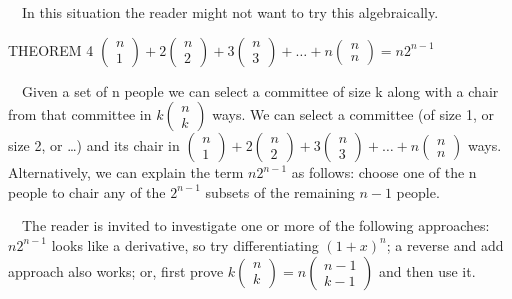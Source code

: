 \documentclass{article}
\begin{document}
\ \ In this situation the reader might not want to try this algebraically. 

THEOREM 4  
$\left(\begin{matrix}n\\1\end{matrix}\right)+2\left(\begin{matrix}n\\2\end{matrix}\right)+3\left(\begin{matrix}n\\3\end{matrix}\right)+{\dots}+n\left(\begin{matrix}n\\n\end{matrix}\right)=\mathit{n2}^{n-1}$

\ \ Given a set of  n  people we can select a committee of size  k  along with a chair from that committee in 
$k\left(\begin{matrix}n\\k\end{matrix}\right)$ ways.  We can select a committee (of size 1, or size 2, or …) and its
chair in 
$\left(\begin{matrix}n\\1\end{matrix}\right)+2\left(\begin{matrix}n\\2\end{matrix}\right)+3\left(\begin{matrix}n\\3\end{matrix}\right)+{\dots}+n\left(\begin{matrix}n\\n\end{matrix}\right)$
ways. Alternatively, we can explain the term  $n2^{n-1}$ as follows: choose one of the  n people to chair any of the 
$2^{n-1}$ subsets of the remaining  $n-1$ people. 

\ \ The reader is invited to investigate one or more of the following approaches:  $n2^{n-1}$ looks like a derivative,
so try differentiating  $\left(1+x\right)^n$; a reverse and add approach also works; or, first prove  
$k\left(\begin{matrix}n\\k\end{matrix}\right)=n\left(\begin{matrix}n-1\\k-1\end{matrix}\right)$ and then use it.
\end{document}
